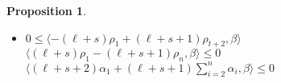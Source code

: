 \documentclass{amsart}
\newtheorem{proposition}[theorem]{Proposition}
\numberwithin{theorem}{section}
\begin{document}
\begin{proposition}
\begin{enumerate}
\begin{itemize}
            $\langle \sum_{i=2}^{t+1} \alpha_i, \beta\rangle \le 0$\\
          \item $0 \le \langle -(\ell+s)\rho_1+(\ell+s+1)\rho_{t+2}, \beta\rangle$\\
            $\langle (\ell+s)\rho_1-(\ell+s+1)\rho_n, \beta\rangle \le 0$\\
            $\langle (\ell+s+2)\alpha_1+(\ell+s+1)\sum_{i=2}^n\alpha_i, \beta\rangle \le 0$\\
        \end{itemize}
    \end{enumerate}
  \end{proposition}


  
\end{document}
